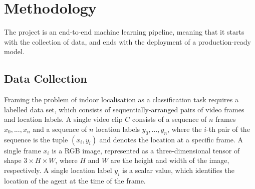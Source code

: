 \documentclass[a4paper]{article}
\begin{document}



  \section{Methodology} %
  \label{sec:methodology}

  The project is an end-to-end machine learning pipeline, meaning that it
  starts with the collection of data, and ends with the deployment of a
  production-ready model. 

  \subsection{Data Collection} %
  \label{sub:data-collection}


  Framing the problem of indoor localisation as a classification task requires a
  labelled data set, which consists of sequentially-arranged pairs of video
  frames and location labels. A single video clip $C$ consists of a sequence of
  $n$ frames $x_0, ..., x_n$ and a sequence of $n$ location labels $y_0, ...,
  y_n$, where the $i$-th pair of the sequence is the tuple $(x_i,y_i)$ and
  denotes the location at a specific frame. A single frame $x_i$ is a RGB image,
  represented as a three-dimensional tensor of shape $3 \times H \times W$,
  where $H$ and $W$ are the height and width of the image, respectively. A
  single location label $y_i$ is a scalar value, which identifies the location
  of the agent at the time of the frame. 
\end{document}
